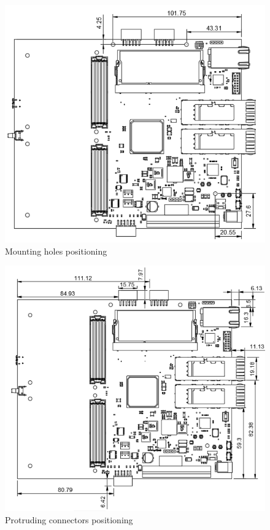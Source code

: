 \documentclass[12pt,oneside,a4]{article}
\begin{document}
\begin{figure}[H]
\begin{center}
\includegraphics[width=1\linewidth]{holes.png}
 \caption{Mounting holes positioning}\label{holes}
\end{center}
\end{figure}

\begin{figure}[H]
\begin{center}
\includegraphics[width=1\linewidth]{connectors.png}
 \caption{Protruding connectors positioning}\label{connectors}
\end{center}
\end{figure}
\end{document}
